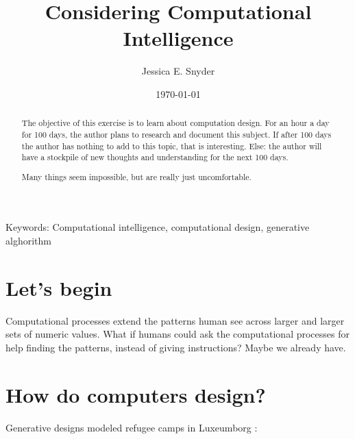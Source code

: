 \documentclass[a4paper,11pt]{article}
\begin{document}
\title{Considering Computational Intelligence}
\author{Jessica E. Snyder}
\date{\today}
\maketitle

\begin{abstract}
The objective of this exercise is to learn about computation design. For an hour a day for 100 days, the author plans to research and document this subject. If after 100 days the author has nothing to add to this topic, that is interesting. Else: the author will have a stockpile of new thoughts and understanding for the next 100 days.

Many things seem impossible, but are really just uncomfortable. 

\end{abstract}

Keywords: Computational intelligence, computational design, generative alghorithm

\tableofcontents

\section{Let's begin}
Computational processes extend the patterns human see across larger and larger sets of numeric values. What if humans could ask the computational processes for help finding the patterns, instead of giving instructions? Maybe we already have. 
 
\section{How do computers design?}

Generative designs modeled refugee camps in Luxeumborg \cite{daher2017data}:
\end{document}
